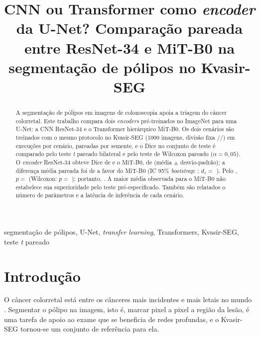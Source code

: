 \documentclass[conference]{IEEEtran}
\begin{document}
\title{CNN ou Transformer como \textit{encoder} da U-Net? Comparação pareada entre ResNet-34 e
MiT-B0 na segmentação de pólipos no Kvasir-SEG}

\author{
}

\maketitle

\begin{abstract}
A segmentação de pólipos em imagens de colonoscopia apoia a triagem do câncer colorretal.
Este trabalho compara dois \textit{encoders} pré-treinados no ImageNet para uma U-Net: a CNN
ResNet-34 e o Transformer hierárquico MiT-B0. Os dois cenários são treinados com o mesmo
protocolo no Kvasir-SEG (1000 imagens, divisão fixa \NTrain/\NVal/\NTest) em \NPairs{} execuções
por cenário, pareadas por semente, e o Dice no conjunto de teste é comparado pelo teste
\textit{t} pareado bilateral e pelo teste de Wilcoxon pareado ($\alpha = 0{,}05$). O
\textit{encoder} ResNet-34 obteve Dice de \DiceBase{} e o MiT-B0, de \DiceAlt{} (média $\pm$
desvio-padrão); a diferença média pareada foi de \DiceDiff{} a favor do MiT-B0 (IC 95\%
\textit{bootstrap}: \DiceCI{}; $d_z = $ \DiceDz{}). Pelo \DiceTest{}, $p = $ \DiceTP{}
(Wilcoxon: $p = $ \DiceWP{}); portanto, \DiceDecision{}. A maior média observada para o MiT-B0
não estabelece sua superioridade pelo teste pré-especificado. Também são relatados o número de parâmetros
e a latência de inferência de cada cenário.
\end{abstract}

\begin{IEEEkeywords}
segmentação de pólipos, U-Net, \textit{transfer learning}, Transformers, Kvasir-SEG, teste
\textit{t} pareado
\end{IEEEkeywords}

\section{Introdução}

O câncer colorretal está entre os cânceres mais incidentes e mais letais no mundo
\cite{sung2021globocan}. Segmentar o pólipo na imagem, isto é, marcar pixel a pixel a região da lesão, é uma
tarefa de apoio ao exame que se beneficia de redes profundas, e o Kvasir-SEG
\cite{jha2020kvasir} tornou-se um conjunto de referência para ela.
\end{document}
